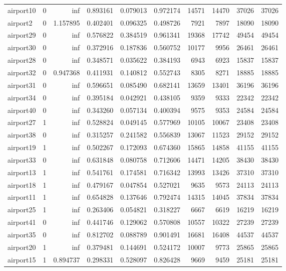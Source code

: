 \begin{longtable}{|l|r|r|r|r|r|r|r|r|r|}
airport10 & 0 & inf & 0.893161 & 0.079013 & 0.972174 & 14571 & 14470 & 37026 & 37026 \\
airport2 & 0 & 1.157895 & 0.402401 & 0.096325 & 0.498726 & 7921 & 7897 & 18090 & 18090 \\
airport29 & 0 & inf & 0.576822 & 0.384519 & 0.961341 & 19368 & 17742 & 49454 & 49454 \\
airport30 & 0 & inf & 0.372916 & 0.187836 & 0.560752 & 10177 & 9956 & 26461 & 26461 \\
airport28 & 0 & inf & 0.348571 & 0.035622 & 0.384193 & 6943 & 6923 & 15837 & 15837 \\
airport32 & 0 & 0.947368 & 0.411931 & 0.140812 & 0.552743 & 8305 & 8271 & 18885 & 18885 \\
airport31 & 0 & inf & 0.596651 & 0.085490 & 0.682141 & 13659 & 13401 & 36196 & 36196 \\
airport34 & 0 & inf & 0.395184 & 0.042921 & 0.438105 & 9359 & 9333 & 22342 & 22342 \\
airport40 & 0 & inf & 0.343260 & 0.057134 & 0.400394 & 9575 & 9353 & 24584 & 24584 \\
airport27 & 1 & inf & 0.528824 & 0.049145 & 0.577969 & 10105 & 10067 & 23408 & 23408 \\
airport38 & 0 & inf & 0.315257 & 0.241582 & 0.556839 & 13067 & 11523 & 29152 & 29152 \\
airport19 & 1 & inf & 0.502267 & 0.172093 & 0.674360 & 15865 & 14858 & 41155 & 41155 \\
airport33 & 0 & inf & 0.631848 & 0.080758 & 0.712606 & 14471 & 14205 & 38430 & 38430 \\
airport13 & 1 & inf & 0.541761 & 0.174581 & 0.716342 & 13993 & 13426 & 37310 & 37310 \\
airport18 & 1 & inf & 0.479167 & 0.047854 & 0.527021 & 9635 & 9573 & 24113 & 24113 \\
airport11 & 1 & inf & 0.654828 & 0.137646 & 0.792474 & 14315 & 14045 & 37834 & 37834 \\
airport25 & 1 & inf & 0.263406 & 0.054821 & 0.318227 & 6667 & 6619 & 16219 & 16219 \\
airport41 & 0 & inf & 0.441746 & 0.129062 & 0.570808 & 10557 & 10322 & 27239 & 27239 \\
airport35 & 0 & inf & 0.812702 & 0.088789 & 0.901491 & 16681 & 16408 & 44537 & 44537 \\
airport20 & 1 & inf & 0.379481 & 0.144691 & 0.524172 & 10007 & 9773 & 25865 & 25865 \\
airport15 & 1 & 0.894737 & 0.298331 & 0.528097 & 0.826428 & 9669 & 9459 & 25181 & 25181 \\

\end{longtable}
